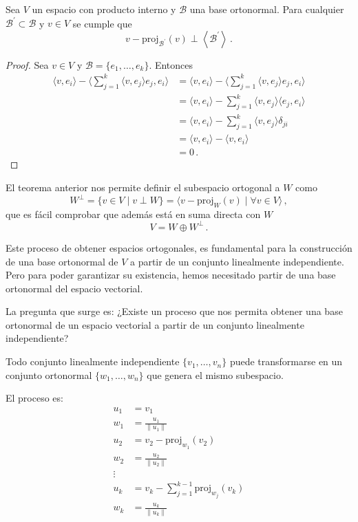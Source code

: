 \begin{theo}
  Sea $V$ un espacio con producto interno y $\mathcal{B}$ una base ortonormal. Para cualquier $\mathcal{B}^\prime\subset\mathcal{B}$ y $v \in V$
  se cumple que
  \[
    v - \text{proj}_{\mathcal{B}^\prime}(v) \perp \left<\mathcal{B}^\prime\right>\,.
  \]
\end{theo}
\begin{proof}
  Sea $v\in V$ y $\mathcal{B}=\{e_1, \ldots, e_k\}$. Entonces
  \begin{align*}
    \langle v, e_i\rangle - \langle\sum_{j=1}^k \langle v, e_j \rangle e_j, e_i\rangle
     & = \langle v, e_i\rangle - \langle\sum_{j=1}^k \langle v, e_j \rangle e_j, e_i\rangle  \\
     & = \langle v, e_i\rangle - \sum_{j=1}^k \langle v, e_j \rangle \langle e_j, e_i\rangle \\
     & = \langle v, e_i\rangle - \sum_{j=1}^k \langle v, e_j \rangle \delta_{ji}             \\
     & = \langle v, e_i\rangle - \langle v, e_i \rangle                                      \\
     & = 0\,.
  \end{align*}
\end{proof}

El teorema anterior nos permite definir el subespacio ortogonal a $W$ como
\[
  W^\perp = \{v \in V \mid v \perp W\} = \langle v - \text{proj}_W(v)\mid \forall v \in V \rangle\,,
\]
que es fácil comprobar que además está en suma directa con $W$
\[
  V=W\oplus W^\perp\,.
\]

Este proceso de obtener espacios ortogonales, es fundamental para la construcción de una base ortonormal de $V$ a partir de un conjunto linealmente independiente. Pero para poder garantizar su existencia, hemos necesitado partir de una base ortonormal del espacio vectorial.

La pregunta que surge es: ¿Existe un proceso que nos permita obtener una base ortonormal de un espacio vectorial a partir de un conjunto linealmente independiente?

\begin{theo}
  \label{th:gram_schmidt}
  Todo conjunto linealmente independiente $\{v_1, \ldots, v_n\}$ puede transformarse en un conjunto ortonormal $\{w_1, \ldots, w_n\}$ que genera el mismo subespacio.

  El proceso es:
  \begin{align*}
    u_1    & = v_1                                           \\
    w_1    & = \frac{u_1}{\|u_1\|}                           \\
    u_2    & = v_2 - \text{proj}_{w_1}(v_2)                  \\
    w_2    & = \frac{u_2}{\|u_2\|}                           \\
    \vdots &                                                 \\
    u_k    & = v_k - \sum_{j=1}^{k-1} \text{proj}_{w_j}(v_k) \\
    w_k    & = \frac{u_k}{\|u_k\|}
  \end{align*}
\end{theo}

